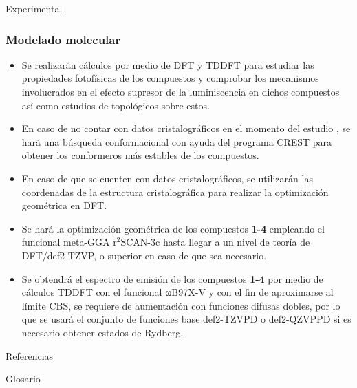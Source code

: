 \documentclass[%
spanish,
mexico]{beamer}
\newcommand\scan{\(\text{r}^{2}\text{SCAN-3c}\)}
\begin{document}
\begin{frame}{Experimental}
    \subsubsection{Modelado molecular}
    \begin{itemize}
        \item Se realizarán cálculos \insilico{} por medio de \gls{DFT} y \gls{TDDFT} para estudiar las propiedades fotofísicas de los compuestos y comprobar los mecanismos involucrados en el efecto supresor de la luminiscencia en dichos compuestos así como estudios de topológicos sobre estos.
        \item En caso de no contar con datos cristalográficos en el momento del estudio \insilico{}, se hará una búsqueda conformacional con ayuda del programa \gls{CREST} \cite{prachtAutomatedExplorationLowenergy2020} para obtener los conformeros más estables de los compuestos.
        \item En caso de que se cuenten con datos cristalográficos, se utilizarán las coordenadas de la estructura cristalográfica para realizar la optimización geométrica en DFT.
        \item Se hará la optimización geométrica de los compuestos \textbf{1-4} empleando el funcional meta-GGA \scan{} \cite{gasevicOptimizationSCAN3cComposite2022} hasta llegar a un nivel de teoría de DFT/def2-TZVP, o superior en caso de que sea necesario.
        \item Se obtendrá el espectro de emisión de los compuestos \textbf{1-4} por medio de cálculos \gls{TDDFT} con el funcional ωB97X-V y con el fin de aproximarse al límite CBS, se requiere de aumentación con funciones difusas dobles, por lo que se usará el conjunto de funciones base def2-TZVPD o def2-QZVPPD si es necesario obtener estados de Rydberg.
    \end{itemize}
\end{frame}

\begin{frame}[allowframebreaks]{Referencias}
	\small
	\printbibliography{}
\end{frame}

\begin{frame}[allowframebreaks]{Glosario}
	\small
	\printglossary[type=main,style=long,nonumberlist]
\end{frame}
\end{document}
